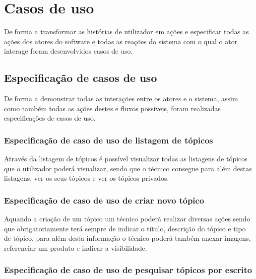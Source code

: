 \section{Casos de uso}
De forma a transformar as histórias de utilizador em ações e especificar todas as ações dos atores do 
software e todas as reações do sistema com o qual o ator interage foram desenvolvidos casos de uso.


\newpage

\subsection{Especificação de casos de uso}

De forma a demonstrar todas as interações entre os atores e o sistema, assim como também todas as ações 
destes e fluxos possíveis, foram realizadas especificações de casos de uso.

\subsubsection{Especificação de caso de uso de listagem de tópicos}

Através da listagem de tópicos é possível visualizar todas as listagens de tópicos que o utilizador poderá 
visualizar, sendo que o técnico consegue para além destas listagens, ver os seus tópicos e ver os tópicos 
privados.

%



\newpage

\subsubsection{Especificação de caso de uso de criar novo tópico}

Aquando a criação de um tópico um técnico poderá realizar diversas ações sendo que obrigatoriamente 
terá sempre de indicar o título, descrição do tópico e tipo de tópico, para além desta informação o técnico poderá também
anexar imagens, referenciar um produto e indicar a visibilidade.



\subsubsection{Especificação de caso de uso de pesquisar tópicos por escrito}

